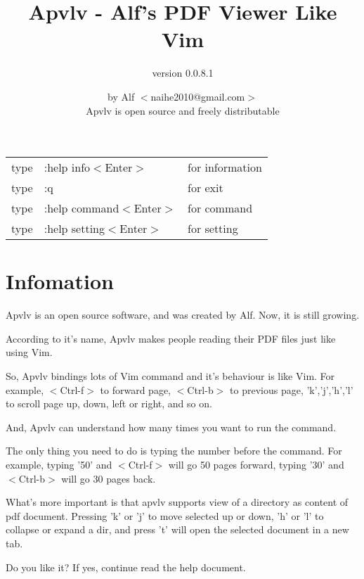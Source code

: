 \documentclass[a4paper,12pt]{article}
\begin{document}
\large

\title{Apvlv - Alf's PDF Viewer Like Vim}
\author{version 0.0.8.1}
\date{by Alf $<$naihe2010@gmail.com$>$ \\Apvlv is open source and freely distributable}
\maketitle{}

\begin{center}
\begin{tabular}{lll}
type & :help info$<$Enter$>$      & for information \\
type & :q                         & for exit \\
type & :help command$<$Enter$>$   & for command \\
type & :help setting$<$Enter$>$   & for setting \\
\end{tabular}
\end{center}

\newpage

\section{Infomation}

Apvlv is an open source software, and was created by Alf. Now, it is still growing.

According to it's name, Apvlv makes people reading their PDF files just like using Vim.

So, Apvlv bindings lots of Vim command and it's behaviour is like Vim. For example, $<$Ctrl-f$>$ to forward page, $<$Ctrl-b$>$ to previous page, 'k','j','h','l' to scroll page up, down, left or right, and so on. 

And, Apvlv can understand how many times you want to run the command.

The only thing you need to do is typing the number before the command. For example, typing '50' and $<$Ctrl-f$>$ will go 50 pages forward, typing '30' and $<$Ctrl-b$>$ will go 30 pages back.

What's more important is that apvlv supports view of a directory as content of pdf document. Pressing 'k' or 'j' to move selected up or down, 'h' or 'l' to collapse or expand a dir, and press 't' will open the selected document in a new tab.

Do you like it? If yes, continue read the help document.

\newpage
\end{document}
